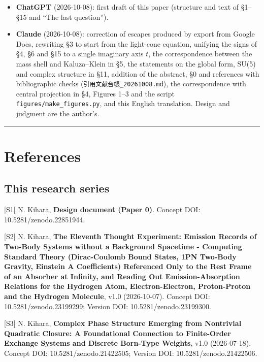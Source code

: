 \documentclass[
  a4paper,
]{article}
\providecommand{\tightlist}{%
  \setlength{\itemsep}{0pt}\setlength{\parskip}{0pt}}
\begin{document}
\begin{itemize}
\tightlist
\item
  \textbf{ChatGPT} (2026-10-08): first draft of this paper (structure
  and text of §1--§15 and ``The last question'').
\item
  \textbf{Claude} (2026-10-08): correction of escapes produced by export
  from Google Docs, rewriting §3 to start from the light-cone equation,
  unifying the signs of §4, §6 and §15 to a single imaginary axis \(t\),
  the correspondence between the mass shell and Kaluza--Klein in §5, the
  statements on the global form, SU(5) and complex structure in §11,
  addition of the abstract, §0 and references with bibliographic checks
  (\texttt{引用文献台帳\_20261008.md}), the correspondence with central
  projection in §4, Figures 1--3 and the script
  \texttt{figures/make\_figures.py}, and this English translation.
  Design and judgment are the author's.
\end{itemize}

\begin{center}\rule{0.5\linewidth}{0.5pt}\end{center}

\section{References}\label{references}

\subsection{This research series}\label{this-research-series}

{[}S1{]} N. Kihara, \textbf{Design document (Paper 0)}. Concept DOI:
10.5281/zenodo.22851944.

{[}S2{]} N. Kihara, \textbf{The Eleventh Thought Experiment: Emission
Records of Two-Body Systems without a Background Spacetime - Computing
Standard Theory (Dirac-Coulomb Bound States, 1PN Two-Body Gravity,
Einstein A Coefficients) Referenced Only to the Rest Frame of an
Absorber at Infinity, and Reading Out Emission-Absorption Relations for
the Hydrogen Atom, Electron-Electron, Proton-Proton and the Hydrogen
Molecule}, v1.0 (2026-10-07). Concept DOI: 10.5281/zenodo.23199299;
Version DOI: 10.5281/zenodo.23199300.

{[}S3{]} N. Kihara, \textbf{Complex Phase Structure Emerging from
Nontrivial Quadratic Closure: A Foundational Connection to Finite-Order
Exchange Systems and Discrete Born-Type Weights}, v1.0 (2026-07-18).
Concept DOI: 10.5281/zenodo.21422505; Version DOI:
10.5281/zenodo.21422506.
\end{document}
